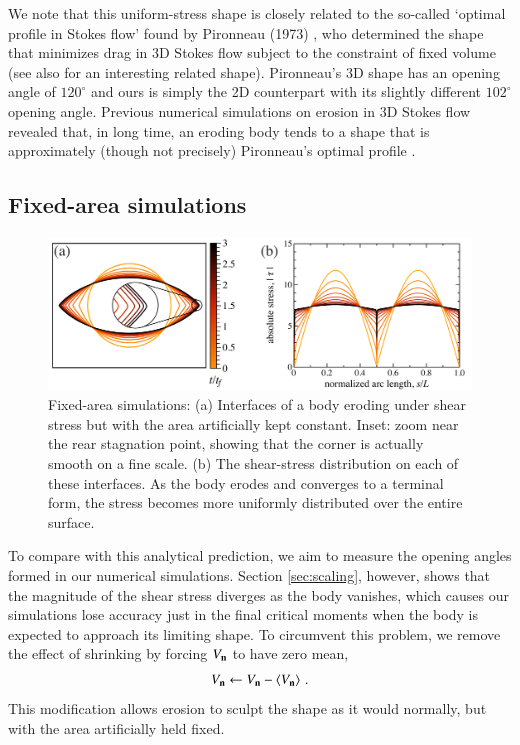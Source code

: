 \documentclass[preprint, 10pt]{elsarticle}
\begin{document}

We note that this uniform-stress shape is closely related to the so-called `optimal profile in Stokes flow' found by Pironneau (1973) \cite{pir1973}, who determined the shape that minimizes drag in 3D Stokes flow subject to the constraint of fixed volume (see also \cite{mon-lau2015} for an interesting related shape). Pironneau's 3D shape has an opening angle of $120^{\circ}$ and ours is simply the 2D counterpart with its slightly different $102^{\circ}$ opening angle. Previous numerical simulations on erosion in 3D Stokes flow revealed that, in long time, an eroding body tends to a shape that is approximately (though not precisely) Pironneau's optimal profile \cite{mit-spa2016}.


\subsection{Fixed-area simulations}

\begin{figure}%
\begin{center}
\includegraphics[width = 0.85 \textwidth]{./figs/fixed_intface.pdf}
\caption{Fixed-area simulations: (a) Interfaces of a body eroding under shear stress but with the area artificially kept constant. Inset: zoom near the rear stagnation point, showing that the corner is actually smooth on a fine scale. (b) The shear-stress distribution on each of these interfaces. As the body erodes and converges to a terminal form, the stress becomes more uniformly distributed over the entire surface.}
\label{fixed_intface}
\end{center}
\end{figure}

To compare with this analytical prediction, we aim to measure the opening angles formed in our numerical simulations. Section \ref{sec:scaling}, however, shows that the magnitude of the shear stress diverges as the body vanishes, which causes our simulations lose accuracy just in the final critical moments when the body is expected to approach its limiting shape. To circumvent this problem, we remove the effect of shrinking by forcing $V_{\mathbf{n}}$ to have zero mean,
\begin{align}
V_{\mathbf{n}} \leftarrow V_{\mathbf{n}} - \left< V_{\mathbf{n}} \right> \, .
\end{align}
This modification allows erosion to sculpt the shape as it would normally, but with the area artificially held fixed.
\end{document}
